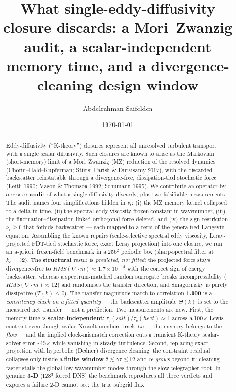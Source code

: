 \documentclass[aps,prfluids,preprint,superscriptaddress,nofootinbib]{revtex4-2}
\begin{document}
\title{What single-eddy-diffusivity closure discards: a Mori–Zwanzig audit, a scalar-independent memory time, and a divergence-cleaning design window}

\author{Abdelrahman Saifelden}

\date{\today}

\begin{abstract}
Eddy-diffusivity (``K-theory'') closures represent all unresolved turbulent transport with a single scalar diffusivity. Such closures are known to arise as the Markovian (short-memory) limit of a Mori–Zwanzig (MZ) reduction of the resolved dynamics (Chorin–Hald–Kupferman; Stinis; Parish \& Duraisamy 2017), with the discarded backscatter reinstatable through a divergence-free, dissipation-tied stochastic force (Leith 1990; Mason \& Thomson 1992; Schumann 1995). We contribute an operator-by-operator \textbf{audit} of what a single diffusivity discards, plus two falsifiable measurements. The audit names four simplifications hidden in $\nu _{t}$: (i) the MZ memory kernel collapsed to a delta in time, (ii) the spectral eddy viscosity frozen constant in wavenumber, (iii) the fluctuation–dissipation-linked orthogonal force deleted, and (iv) the sign restriction $\nu _{t}\ge 0$ that forbids backscatter — each mapped to a term of the generalized Langevin equation. Assembling the known repairs (scale-selective spectral eddy viscosity, Leray-projected FDT-tied stochastic force, exact Leray projection) into one closure, we run an a-priori, frozen-field benchmark in a 256\ensuremath{^{2}} periodic box (sharp-spectral filter at $k_{c}=32$). The \textbf{structural} result is \emph{predicted, not fitted}: the projected force stays divergence-free to $RMS(\nabla \cdot m)\approx 1.7\times 10^{-14}$ with the correct sign of energy backscatter, whereas a spectrum-matched random surrogate breaks incompressibility ($RMS(\nabla \cdot m)\approx 12$) and randomises the transfer direction, and Smagorinsky is purely dissipative ($T(k)\le 0$). The transfer-magnitude match to correlation \textbf{1.000} is a \emph{consistency check on a fitted quantity} — the backscatter amplitude $\Theta (k)$ is set to the measured net transfer — not a prediction. Two measurements are new. First, the memory time is \textbf{scalar-independent}: $\tau _{c}(salt)/\tau _{c}(heat)\approx 1$ across a 100\ensuremath{\times} Lewis contrast even though scalar Nusselt numbers track $Le$ — the memory belongs to the \emph{flow} — and the implied clock-mismatch correction cuts a transient K-theory scalar-solver error \textasciitilde{}15\ensuremath{\times} while vanishing in steady turbulence. Second, replacing exact projection with hyperbolic (Dedner) divergence cleaning, the constraint residual collapses only inside a \textbf{finite window} $2\lesssim \gamma \tau \lesssim 12$ and \emph{re-grows} beyond it: cleaning faster stalls the global low-wavenumber modes through the slow telegrapher root. In genuine \textbf{3-D} (128\ensuremath{^{3}} forced DNS) the benchmark reproduces all three verdicts and exposes a failure 2-D cannot see: the true subgrid flux 
\end{abstract}
\end{document}
